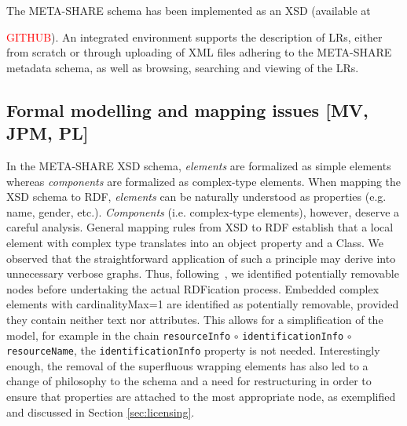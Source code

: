 \documentclass{llncs}
\begin{document}
The META-SHARE schema has been implemented as an XSD (available at {\textcolor{red}{GITHUB}). An integrated environment supports the description of LRs, either from scratch or through uploading of XML files adhering to the META-SHARE metadata schema, as well as browsing, searching and viewing of the LRs.
\subsection{Formal modelling and mapping issues [MV, JPM, PL]}
\label{sec:mapping}
In the META-SHARE XSD schema, \emph{elements} are formalized as simple elements
whereas \emph{components} are formalized as complex-type elements. When mapping
the XSD schema to RDF, \emph{elements} can be naturally understood as properties
(e.g. name, gender, etc.). \emph{Components} (i.e. complex-type elements),
however, deserve a careful analysis. General mapping rules from XSD to RDF
establish that a local element with complex type translates into an object
property and a Class. We observed that the straightforward application of such a
principle may derive into unnecessary verbose graphs. Thus,
following~\cite{Villegas2014}, we identified potentially removable nodes before
undertaking the actual RDFication process. Embedded complex elements with
cardinalityMax=1 are identified as potentially removable, provided they contain
neither text nor attributes. This allows for a simplification of the model, for
example in the chain {\tt resourceInfo} $\circ$ {\tt identificationInfo}
$\circ$ {\tt resourceName}, the {\tt identificationInfo} property is not needed. Interestingly enough, the removal of the superfluous wrapping elements has also led to a change of philosophy to the schema and a need for restructuring in order to ensure that properties are attached to the most appropriate node, as exemplified and discussed in Section \ref{sec:licensing}.
}
\end{document}
